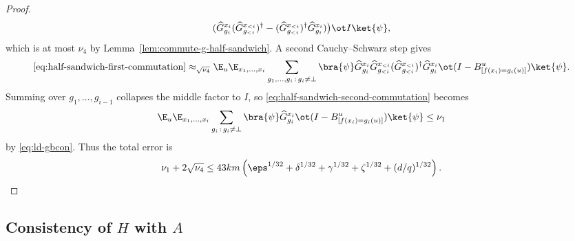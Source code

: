 \begin{proof}
\begin{equation}
		(\widehat G_{g_i}^{x_i}(\widehat G_{g_{<i}}^{x_{<i}})^\dagger - (\widehat G_{g_{<i}}^{x_{<i}})^\dagger \widehat G_{g_i}^{x_i})\bigr)
		\ot I \ket{\psi},
	\end{equation}
	which is at most $\nu_4$ by Lemma~\ref{lem:commute-g-half-sandwich}. A second Cauchy--Schwarz step gives
	\begin{equation}\label{eq:half-sandwich-second-commutation}
		\eqref{eq:half-sandwich-first-commutation}
		\approx_{\sqrt{\nu_4}}
		\E_u \E_{x_1,\dots,x_i} \sum_{g_1,\dots,g_i\,:\,g_i\ne\bot}
		\bra{\psi}
		\widehat G_{g_i}^{x_i}\widehat G_{g_{<i}}^{x_{<i}}(\widehat G_{g_{<i}}^{x_{<i}})^\dagger \widehat G_{g_i}^{x_i}
		\ot (I-B_{[f(x_i)=g_i(u)]}^u)\ket{\psi}.
	\end{equation}
	Summing over $g_1,\dots,g_{i-1}$ collapses the middle factor to $I$, so \ref{eq:half-sandwich-second-commutation} becomes
	\[
		\E_u \E_{x_1,\dots,x_i} \sum_{g_i\,:\,g_i\ne\bot}
		\bra{\psi} \widehat G_{g_i}^{x_i} \ot (I-B_{[f(x_i)=g_i(u)]}^u)\ket{\psi}
		\le \nu_1
	\]
	by \ref{eq:ld-gbcon}. Thus the total error is
	\[
		\nu_1 + 2\sqrt{\nu_4}
		\le
		43km\left(\eps^{1/32}+\delta^{1/32}+\gamma^{1/32}+\zeta^{1/32}+(d/q)^{1/32}\right).
	\]
\end{proof}

\subsection{Consistency of $H$ with $A$}
\label{sec:consistency-of-h-with-a}

